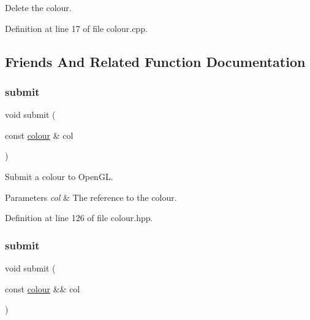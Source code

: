 Delete the colour. 



Definition at line 17 of file colour.\+cpp.



\subsection{Friends And Related Function Documentation}
\mbox{\label{classglpp_1_1colour_af5ae9d62acf85a32b5e416b45ba5db4b}} 
\subsubsection{\texorpdfstring{submit}{submit}\hspace{0.1cm}{\footnotesize\ttfamily [1/2]}}
{\footnotesize\ttfamily void submit (\begin{DoxyParamCaption}\item[{const \hyperlink{classglpp_1_1colour}{colour} \&}]{col }\end{DoxyParamCaption})\hspace{0.3cm}{\ttfamily [friend]}}



Submit a colour to Open\+GL. 


\begin{DoxyParams}{Parameters}
{\em col} & The reference to the colour. \\
\hline
\end{DoxyParams}


Definition at line 126 of file colour.\+hpp.

\mbox{\label{classglpp_1_1colour_a2d8abc29cef9c846af119655c4b65f4c}} 
\subsubsection{\texorpdfstring{submit}{submit}\hspace{0.1cm}{\footnotesize\ttfamily [2/2]}}
{\footnotesize\ttfamily void submit (\begin{DoxyParamCaption}\item[{const \hyperlink{classglpp_1_1colour}{colour} \&\&}]{col }\end{DoxyParamCaption})\hspace{0.3cm}{\ttfamily [friend]}}



